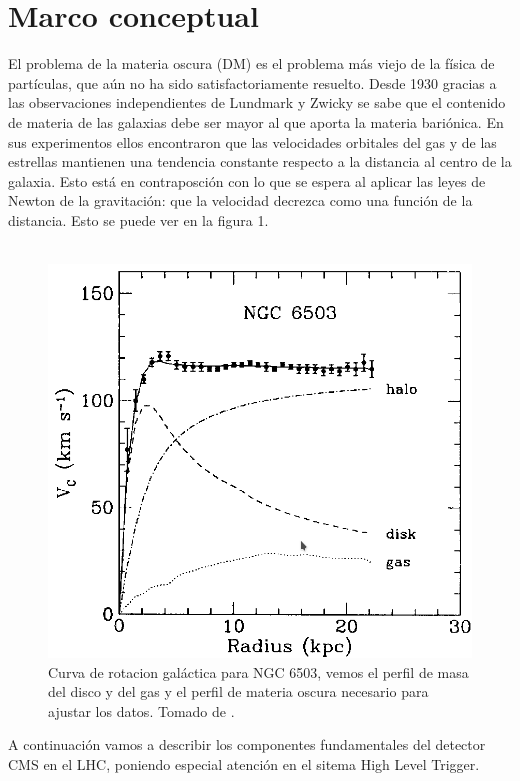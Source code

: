 \section{Marco conceptual}
El problema de la materia oscura (DM) es el problema más viejo de la física de partículas, que aún no ha sido satisfactoriamente resuelto. Desde 1930 gracias a las observaciones independientes de Lundmark y Zwicky \cite{Zwi,Lun} se sabe que el contenido de materia de las galaxias debe ser mayor al que aporta la materia bariónica. En sus experimentos ellos encontraron que las velocidades orbitales del gas y de las estrellas mantienen una tendencia constante respecto a la distancia al centro de la galaxia.
 Esto está en contraposción con lo que se espera al aplicar las leyes de Newton de la gravitación: que la velocidad decrezca como una función de la distancia. Esto se puede ver en la figura 1.
\\
\\
\begin{figure}
\centering
\includegraphics[width=12cm]{F1.png}
\caption{\label{fig:frog} Curva de rotacion galáctica para NGC 6503, vemos el perfil de masa del disco y del gas y el perfil de materia oscura necesario para ajustar los datos. Tomado de \cite{Free}.}
\end{figure}
A continuación vamos a describir los componentes fundamentales del detector CMS en el LHC, poniendo especial atención en el sitema High Level Trigger.


\label{sec:examples}

